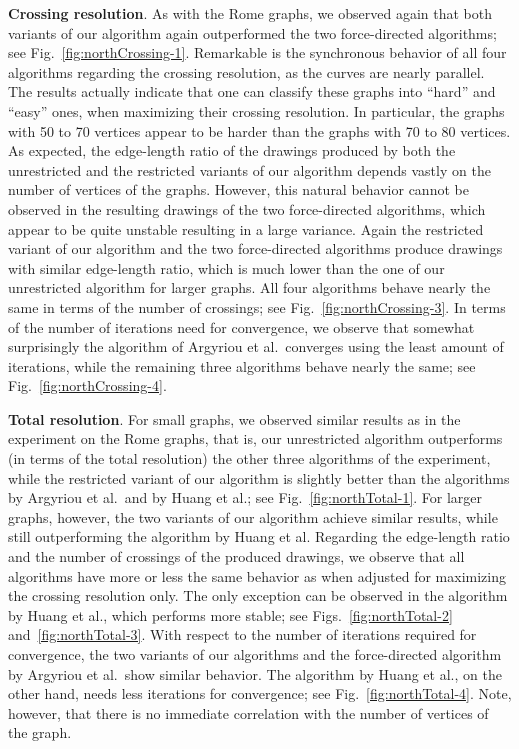 \documentclass{comjnl}
\newcommand{\myparagraph}[1]{\medskip\noindent\textbf{#1}.}
\begin{document}
\myparagraph{Crossing resolution} As with the Rome graphs, we observed again that both variants of our algorithm again outperformed the two force-directed algorithms; see Fig.~\ref{fig:northCrossing-1}. Remarkable is the synchronous behavior of all four algorithms regarding the crossing resolution, as the curves are nearly parallel. The results actually indicate that one can classify these graphs into ``hard'' and ``easy'' ones, when maximizing their crossing resolution. In particular, the graphs with 50 to 70 vertices appear to be harder than the graphs with 70 to 80 vertices. As expected, the edge-length ratio of the drawings produced by both the unrestricted and the restricted variants of our algorithm depends vastly on the number of vertices of the graphs. However, this natural behavior cannot be observed in the resulting drawings of the two force-directed algorithms, which appear to be quite unstable resulting in a large variance. Again the restricted variant of our algorithm and the two force-directed algorithms produce drawings with similar edge-length ratio, which is much lower than the one of our unrestricted algorithm for larger graphs. All four algorithms behave nearly the same in terms of the number of crossings; see Fig.~\ref{fig:northCrossing-3}. In terms of the number of iterations need for convergence, we observe that somewhat surprisingly the algorithm of Argyriou et al.\ converges using the least amount of iterations, while the remaining three algorithms behave nearly the same; see Fig.~\ref{fig:northCrossing-4}.

\myparagraph{Total resolution} For small graphs, we observed similar results as in the experiment on the Rome graphs, that is, our unrestricted algorithm outperforms (in terms of the total resolution) the other three algorithms of the experiment, while the restricted variant of our algorithm is slightly better than the algorithms by Argyriou et al.\ and by Huang et al.; see Fig.~\ref{fig:northTotal-1}. For larger graphs, however, the two variants of our algorithm achieve similar results, while still outperforming the algorithm by Huang et al. Regarding the edge-length ratio and the number of crossings of the produced drawings, we observe that all algorithms have more or less the same behavior as when adjusted for maximizing the crossing resolution only. The only exception can be observed in the algorithm by Huang et al., which performs more stable; see Figs.~\ref{fig:northTotal-2} and~\ref{fig:northTotal-3}. With respect to the number of iterations required for convergence, the two variants of our algorithms and the force-directed algorithm by Argyriou et al.\ show similar behavior. The algorithm by Huang et al., on the other hand, needs less iterations for convergence; see Fig.~\ref{fig:northTotal-4}. Note, however, that there is no immediate correlation with the number of vertices of the graph.
\end{document}
